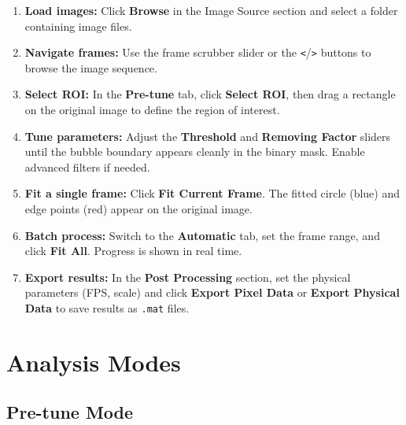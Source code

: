 \documentclass[11pt, letterpaper]{article}
\begin{document}
\begin{enumerate}
    \item \textbf{Load images:} Click \textbf{Browse} in the Image Source
          section and select a folder containing image files.

    \item \textbf{Navigate frames:} Use the frame scrubber slider or the
          \texttt{<}/\texttt{>} buttons to browse the image sequence.

    \item \textbf{Select ROI:} In the \textbf{Pre-tune} tab, click
          \textbf{Select ROI}, then drag a rectangle on the original image
          to define the region of interest.

    \item \textbf{Tune parameters:} Adjust the \textbf{Threshold} and
          \textbf{Removing Factor} sliders until the bubble boundary appears
          cleanly in the binary mask. Enable advanced filters if needed.

    \item \textbf{Fit a single frame:} Click \textbf{Fit Current Frame}. The
          fitted circle (blue) and edge points (red) appear on the original
          image.

    \item \textbf{Batch process:} Switch to the \textbf{Automatic} tab, set
          the frame range, and click \textbf{Fit All}. Progress is shown in
          real time.

    \item \textbf{Export results:} In the \textbf{Post Processing} section,
          set the physical parameters (FPS, scale) and click
          \textbf{Export Pixel Data} or \textbf{Export Physical Data} to save
          results as \texttt{.mat} files.
\end{enumerate}


\section{Analysis Modes}

\subsection{Pre-tune Mode}
\end{document}
